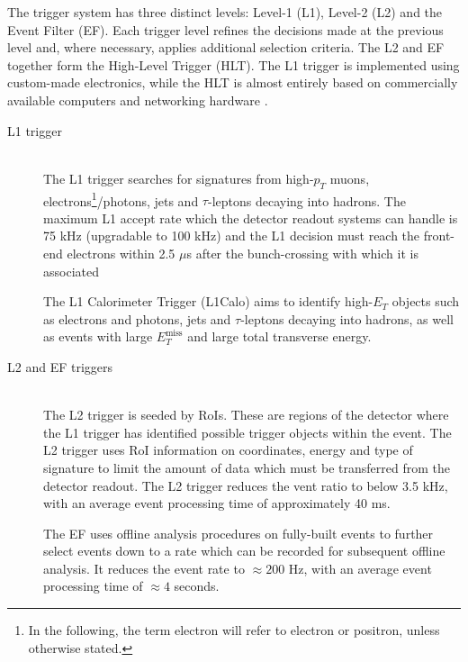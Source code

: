 \documentclass[12pt, twoside]{article}
\numberwithin{equation}{section}
\numberwithin{figure}{section}
\begin{document}
The trigger system has three distinct levels: Level-1 (L1), Level-2 (L2) and the Event Filter (EF). Each trigger level refines the decisions made at the previous level and, where necessary, applies additional selection criteria. The L2 and EF together form the High-Level Trigger (HLT). The L1 trigger is implemented using custom-made electronics, while the HLT is almost entirely based on commercially available computers and networking hardware \cite{trigger}.
\setcounter{footnote}{0}
\begin{description}
    \item[L1 trigger] \hfil \\
    The L1 trigger searches for signatures from high-$p_{T}$ muons, electrons\footnote{ In the following, the term electron will refer to electron or positron, unless otherwise stated.}/photons, jets and $\tau$-leptons decaying into hadrons. The maximum L1 accept rate which the detector readout systems can handle is 75 kHz (upgradable to 100 kHz) and the L1 decision must reach the front-end electrons within 2.5 $\mu$s after the bunch-crossing with which it is associated

    The L1 Calorimeter Trigger (L1Calo) aims to identify high-$E_{T}$ objects such as electrons and photons, jets and $\tau$-leptons decaying into hadrons, as well as events with large $E^{\text{miss}}_{T}$ and large total transverse energy.
    \item[L2 and EF triggers] \hfil \\
    The L2 trigger is seeded by RoIs. These are regions of the detector where the L1 trigger has identified possible trigger objects within the event. The L2 trigger uses RoI information on coordinates, energy and type of signature to limit the amount of data which must be transferred from the detector readout. The L2 trigger reduces the vent ratio to below 3.5 kHz, with an average event processing time of approximately 40 ms.

    The EF uses offline analysis procedures on fully-built events to further select events down to a rate which can be recorded for subsequent offline analysis. It reduces the event rate to $\approx 200$ Hz, with an average event processing time of $\approx 4$ seconds.
\end{description}
\end{document}
